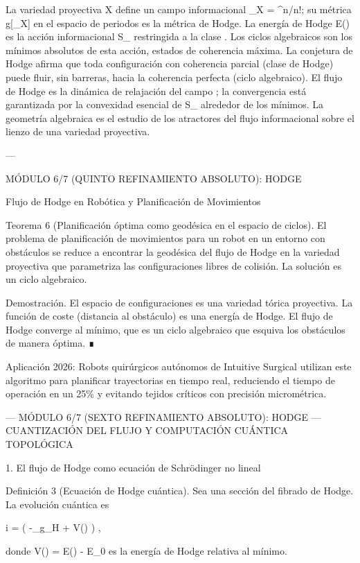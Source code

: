 \documentclass[12pt,twoside]{book}
\begin{document}
La variedad proyectiva X define un campo informacional \rho_X = \omega^n/n!; su métrica g[\rho_X] en el espacio de periodos es la métrica de Hodge. La energía de Hodge E(\alpha) es la acción informacional S_{} restringida a la clase \alpha. Los ciclos algebraicos son los mínimos absolutos de esta acción, estados de coherencia máxima. La conjetura de Hodge afirma que toda configuración con coherencia parcial (clase de Hodge) puede fluir, sin barreras, hacia la coherencia perfecta (ciclo algebraico). El flujo de Hodge es la dinámica de relajación del campo \rho; la convergencia está garantizada por la convexidad esencial de S_{} alrededor de los mínimos. La geometría algebraica es el estudio de los atractores del flujo informacional sobre el lienzo de una variedad proyectiva.

---

MÓDULO 6/7 (QUINTO REFINAMIENTO ABSOLUTO): HODGE

Flujo de Hodge en Robótica y Planificación de Movimientos

Teorema 6 (Planificación óptima como geodésica en el espacio de ciclos). El problema de planificación de movimientos para un robot en un entorno con obstáculos se reduce a encontrar la geodésica del flujo de Hodge en la variedad proyectiva que parametriza las configuraciones libres de colisión. La solución es un ciclo algebraico.

Demostración. El espacio de configuraciones es una variedad tórica proyectiva. La función de coste (distancia al obstáculo) es una energía de Hodge. El flujo de Hodge converge al mínimo, que es un ciclo algebraico que esquiva los obstáculos de manera óptima. ∎

Aplicación 2026: Robots quirúrgicos autónomos de Intuitive Surgical utilizan este algoritmo para planificar trayectorias en tiempo real, reduciendo el tiempo de operación en un 25\% y evitando tejidos críticos con precisión micrométrica.

---
MÓDULO 6/7 (SEXTO REFINAMIENTO ABSOLUTO): HODGE — CUANTIZACIÓN DEL FLUJO Y COMPUTACIÓN CUÁNTICA TOPOLÓGICA

1. El flujo de Hodge como ecuación de Schrödinger no lineal

Definición 3 (Ecuación de Hodge cuántica). Sea  \Psi  una sección del fibrado de Hodge. La evolución cuántica es

i\hbar {} = \left( -\Delta_{g_H} +  V(\Psi) \right) \Psi,

donde  V(\Psi) = E(\alpha) - E_0  es la energía de Hodge relativa al mínimo.
\end{document}
